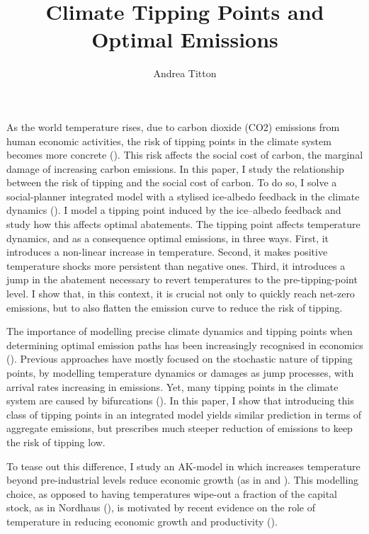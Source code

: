 \documentclass[american, abstract=off]{scrartcl}
\author{Andrea Titton}
\title{Climate Tipping Points and\\ Optimal Emissions}
\newcommand{\note}[1]{
      \ifdraft{
        {\color{blue} \textbf{#1}}
      }{}
    }
\begin{document}
\maketitle

As the world temperature rises, due to carbon dioxide (CO2) emissions from human economic activities, the risk of tipping points in the climate system becomes more concrete (\cite{ashwin_extreme_2020,sledd_cloudier_2021}). This risk affects the social cost of carbon, the marginal damage of increasing carbon emissions. In this paper, I study the relationship between the risk of tipping and the social cost of carbon. To do so, I solve a social-planner integrated model with a stylised ice-albedo feedback in the climate dynamics (\cite{hogg_glacial_2008,ashwin_tipping_2012}). I model a tipping point induced by the ice–albedo feedback and study how this affects optimal abatements. The tipping point affects temperature dynamics, and as a consequence optimal emissions, in three ways. First, it introduces a non-linear increase in temperature. Second, it makes positive temperature shocks more persistent than negative ones. Third, it introduces a jump in the abatement necessary to revert temperatures to the pre-tipping-point level. I show that, in this context, it is crucial not only to quickly reach net-zero emissions, but to also flatten the emission curve to reduce the risk of tipping.

The importance of modelling precise climate dynamics and tipping points when determining optimal emission paths has been increasingly recognised in economics (\cite{van_den_bremer_risk-adjusted_2021,dietz_economic_2021,dietz_are_2020,taconet_social_2021,lontzek_stochastic_2015}). Previous approaches have mostly focused on the stochastic nature of tipping points, by modelling temperature dynamics or damages as jump processes, with arrival rates increasing in emissions. Yet, many tipping points in the climate system are caused by bifurcations (\cite{ashwin_extreme_2020,ashwin_tipping_2012}). In this paper, I show that introducing this class of tipping points in an integrated model yields similar prediction in terms of aggregate emissions, but prescribes much steeper reduction of emissions to keep the risk of tipping low.

To tease out this difference, I study an AK-model in which increases temperature beyond pre-industrial levels reduce economic growth (as in \cite{pindyck_economic_2013} and \cite{hambel_optimal_2021}). This modelling choice, as opposed to having temperatures wipe-out a fraction of the capital stock, as in Nordhaus (\citeyear{nordhaus_estimates_2014,nordhaus_question_2008,nordhaus_revisiting_2017}), is motivated by recent evidence on the role of temperature in reducing economic growth and productivity (\cite{burke_global_2015, dietz_growth_2019}). \note{Add punchline.}
\end{document}
